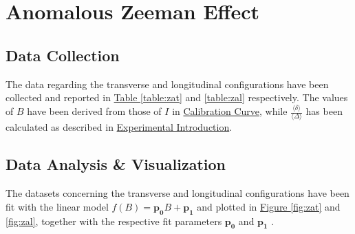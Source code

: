 \documentclass[a4paper,12pt,abstracton]{scrartcl}
\begin{document}
\begin{table}[H]
\caption{}
\centering
{}
\label{table:ZnT}
\end{table}

\clearpage

\section{Anomalous Zeeman Effect}

\subsection{Data Collection}

The data regarding the transverse and longitudinal configurations have been collected and reported in \hyperref[table:zat]{Table \ref*{table:zat}} and \hyperref[table:zal]{ \ref*{table:zal}} respectively. The values of $B$ have been derived from those of $I$ in \hyperref[sec:cal]{Calibration Curve}, while $\frac{\langle \delta \rangle}{\langle \Delta \rangle}$ has been calculated as described in \hyperref[sec:ExpIntro]{Experimental Introduction}.

\subsection{Data Analysis \& Visualization}

The datasets concerning the transverse and longitudinal configurations have been fit with the linear model $f(B)=\boldsymbol{p_0}B+\boldsymbol{p_1}$ and plotted in \hyperref[fig:zat]{Figure \ref*{fig:zat}} and \hyperref[fig:zal]{ \ref*{fig:zal}}, together with the respective fit parameters $\boldsymbol{p_0}$ and  $\boldsymbol{p_1}$ .
\end{document}
